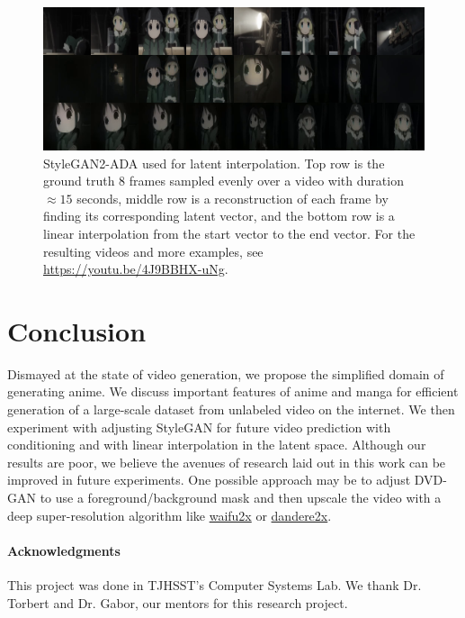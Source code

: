 \documentclass[11pt, oneside]{article}
\begin{document}
\begin{figure}[h!]
  \centering
  \includegraphics[scale=0.2]{results_latent}
  \caption{StyleGAN2-ADA \cite{stylegan2ada} used for latent interpolation.
    Top row is the ground truth 8 frames sampled evenly over a video with
    duration \( \approx 15 \) seconds, middle row is a reconstruction
    of each frame by finding its corresponding latent vector, and the
    bottom row is a linear interpolation from the start vector to
    the end vector. For the resulting videos and more examples, see
    \href{https://youtu.be/4J9BBHX-uNg}{https://youtu.be/4J9BBHX-uNg}.}
  \label{fig:latent}
\end{figure}

\section{Conclusion}
Dismayed at the state of video generation, we propose the simplified domain
of generating anime. We discuss important features of anime and manga for
efficient generation of a large-scale dataset from unlabeled video on the
internet. We then experiment with adjusting StyleGAN \cite{stylegan2ada} for
future video prediction with conditioning and with linear interpolation in the
latent space. Although our results are poor, we believe the avenues of research
laid out in this work can be improved in future experiments. One possible
approach may be to adjust DVD-GAN \cite{dvdgan} to use a foreground/background
mask \cite{scene} and then upscale the video with a deep super-resolution
algorithm like \href{https://github.com/nagadomi/waifu2x}{waifu2x} or
\href{https://github.com/akai-katto/dandere2x}{dandere2x}.

\paragraph{Acknowledgments}
This project was done in TJHSST's Computer Systems Lab. We thank
Dr. Torbert and Dr. Gabor, our mentors for this research project.
\end{document}
